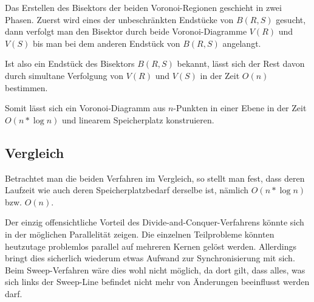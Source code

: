 Das Erstellen des Bisektors der beiden Voronoi-Regionen geschieht in zwei Phasen. Zuerst wird eines der unbeschränkten Endstücke von $B(R,S)$ gesucht, dann verfolgt man den Bisektor durch beide Voronoi-Diagramme $V(R)$ und $V(S)$ bis man bei dem anderen Endstück von $B(R,S)$ angelangt.

Ist also ein Endstück des Bisektors $B(R,S)$ bekannt, lässt sich der Rest davon durch simultane Verfolgung von $V(R)$ und $V(S)$ in der Zeit $O(n)$ bestimmen.

Somit lässt sich ein Voronoi-Diagramm aus $n$-Punkten in einer Ebene in der Zeit $O(n * \log{n})$ und linearem Speicherplatz konstruieren.

\subsection{Vergleich}
\label{ssec:voronoiAlgorithmsComparison}

Betrachtet man die beiden Verfahren im Vergleich, so stellt man fest, dass deren Laufzeit wie auch deren Speicherplatzbedarf derselbe ist, nämlich $O(n * \log{n})$ bzw. $O(n)$.

Der einzig offensichtliche Vorteil des Divide-and-Conquer-Verfahrens könnte sich in der möglichen Parallelität zeigen. Die einzelnen Teilprobleme könnten heutzutage problemlos parallel auf mehreren Kernen gelöst werden. Allerdings bringt dies sicherlich wiederum etwas Aufwand zur Synchronisierung mit sich. Beim Sweep-Verfahren wäre dies wohl nicht möglich, da dort gilt, dass alles, was sich links der Sweep-Line befindet nicht mehr von Änderungen beeinflusst werden darf.
